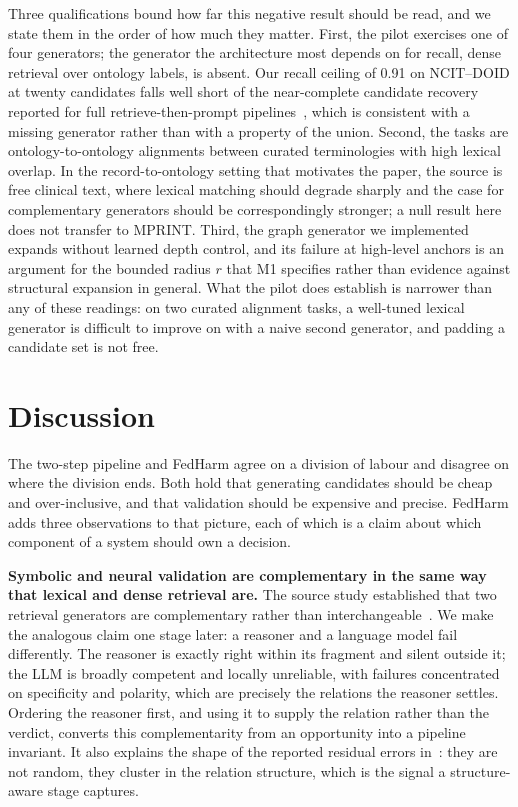 \documentclass[conference]{IEEEtran}
\begin{document}
Three qualifications bound how far this negative result should be read, and we state them in the order of how much they matter. First, the pilot exercises one of four generators; the generator the architecture most depends on for recall, dense retrieval over ontology labels, is absent. Our recall ceiling of 0.91 on NCIT--DOID at twenty candidates falls well short of the near-complete candidate recovery reported for full retrieve-then-prompt pipelines~\cite{b54}, which is consistent with a missing generator rather than with a property of the union. Second, the tasks are ontology-to-ontology alignments between curated terminologies with high lexical overlap. In the record-to-ontology setting that motivates the paper, the source is free clinical text, where lexical matching should degrade sharply and the case for complementary generators should be correspondingly stronger; a null result here does not transfer to MPRINT. Third, the graph generator we implemented expands without learned depth control, and its failure at high-level anchors is an argument for the bounded radius $r$ that M1 specifies rather than evidence against structural expansion in general. What the pilot does establish is narrower than any of these readings: on two curated alignment tasks, a well-tuned lexical generator is difficult to improve on with a naive second generator, and padding a candidate set is not free.

\section{Discussion}

The two-step pipeline and FedHarm agree on a division of labour and disagree on where the division ends. Both hold that generating candidates should be cheap and over-inclusive, and that validation should be expensive and precise. FedHarm adds three observations to that picture, each of which is a claim about which component of a system should own a decision.

\textbf{Symbolic and neural validation are complementary in the same way that lexical and dense retrieval are.} The source study established that two retrieval generators are complementary rather than interchangeable~\cite{b1}. We make the analogous claim one stage later: a reasoner and a language model fail differently. The reasoner is exactly right within its fragment and silent outside it; the LLM is broadly competent and locally unreliable, with failures concentrated on specificity and polarity, which are precisely the relations the reasoner settles. Ordering the reasoner first, and using it to supply the relation rather than the verdict, converts this complementarity from an opportunity into a pipeline invariant. It also explains the shape of the reported residual errors in~\cite{b1}: they are not random, they cluster in the relation structure, which is the signal a structure-aware stage captures.
\end{document}
